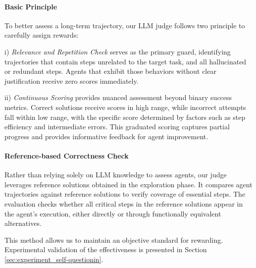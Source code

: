 \paragraph{Basic Principle} To better assess a long-term trajectory, our LLM judge follows two principle to carefully assign rewards:

i) \textit{Relevance and Repetition Check} serves as the primary guard, identifying trajectories that contain steps unrelated to the target task, and all hallucinated or redundant steps. Agents that exhibit those behaviors without clear justification receive zero scores immediately. 

ii) \textit{Continuous Scoring} provides nuanced assessment beyond binary success metrics. Correct solutions receive scores in high range, while incorrect attempts fall within low range, with the specific score determined by factors such as step efficiency and intermediate errors. This graduated scoring captures partial progress and provides informative feedback for agent improvement.

\paragraph{Reference-based Correctness Check} Rather than relying solely on LLM knowledge to assess agents, our judge leverages reference solutions obtained in the exploration phase. It compares agent trajectories against reference solutions to verify coverage of essential steps. The evaluation checks whether all critical steps in the reference solutions appear in the agent's execution, either directly or through functionally equivalent alternatives.

This method allows us to maintain an objective standard for rewarding. Experimental validation of the effectiveness is presented in Section \ref{sec:experiment_self-questionin}.


